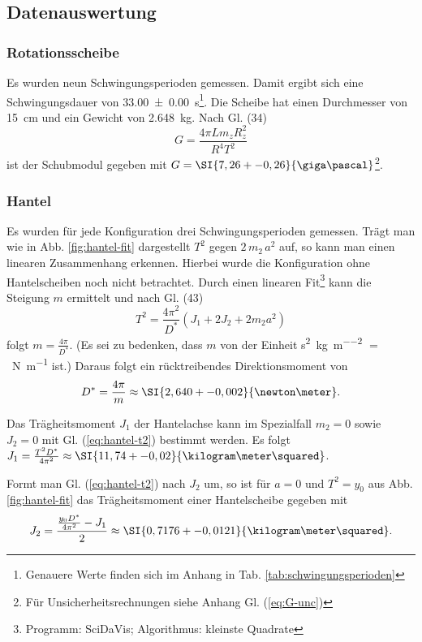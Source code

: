 \subsection{Datenauswertung}

\subsubsection*{Rotationsscheibe}
Es wurden neun Schwingungsperioden gemessen.
Damit ergibt sich eine Schwingungsdauer von \SI{33,00 +- 0,00}{\second}\footnote{Genauere Werte finden sich im Anhang in Tab. \ref{tab:schwingungsperioden}}.
Die Scheibe hat einen Durchmesser von \SI{15}{\centi\meter} und ein Gewicht von \SI{2,648}{\kilogram}.
Nach Gl. (34)
\begin{equation}
	G = \frac{4\pi L m_z R_z^2}{R^4 T^2}
\end{equation}
ist der Schubmodul gegeben mit $G = \SI{7,26+-0,26}{\giga\pascal}$\footnote{Für Unsicherheitsrechnungen siehe Anhang Gl. (\ref{eq:G-unc})}.

\subsubsection*{Hantel}
Es wurden für jede Konfiguration drei Schwingungsperioden gemessen.
Trägt man wie in Abb. \ref{fig:hantel-fit} dargestellt $T^2$ gegen $2 \, m_2 \, a^2$ auf, so kann man einen linearen Zusammenhang erkennen.
Hierbei wurde die Konfiguration ohne Hantelscheiben noch nicht betrachtet.
Durch einen linearen Fit\footnote{Programm: SciDaVis; Algorithmus: kleinste Quadrate} kann die Steigung $m$ ermittelt und nach Gl. (43) 
\begin{equation}
	\label{eq:hantel-t2}
	T^2 = \frac{4\pi^2}{D^*} (J_1 + 2 J_2 + 2 m_2 a^2)
\end{equation}
folgt $m = \frac{4\pi}{D^*}$.
(Es sei zu bedenken, dass $m$ von der Einheit \si{\second\squared\per\kilogram\per\meter\squared} $=$ \si{\per\newton\per\meter} ist.)
Daraus folgt ein rücktreibendes Direktionsmoment von 
\begin{equation}
	D^* = \frac{4\pi}{m} \approx \SI{2,640+-0,002}{\newton\meter}.
\end{equation}

Das Trägheitsmoment $J_1$ der Hantelachse kann im Spezialfall $m_2 = 0$ sowie $J_2 = 0$ mit Gl. (\ref{eq:hantel-t2}) bestimmt werden.
Es folgt $J_1 = \frac{T^2 D^*}{4\pi^2} \approx \SI{11,74 +- 0,02}{\kilogram\meter\squared}$.

Formt man Gl. (\ref{eq:hantel-t2}) nach $J_2$ um, so ist für $a = 0$ und $T^2 = y_0$ aus Abb. \ref{fig:hantel-fit} das Trägheitsmoment einer Hantelscheibe gegeben mit
\begin{equation}
	J_2 = \frac{\frac{y_0 D^*}{4 \pi^2} - J_1}{2} \approx \SI{0,7176 +- 0,0121}{\kilogram\meter\squared}.
\end{equation}

